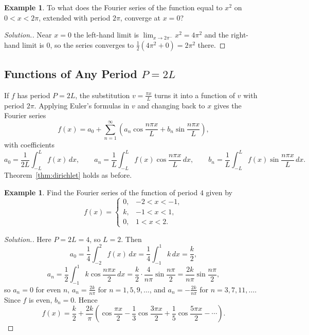 \documentclass[11pt,a4paper]{article}
\theoremstyle{definition}
\newtheorem{exa}[thm]{Example}
\newenvironment{solution}
  {\renewcommand{\qedsymbol}{}\begin{proof}[\textit{Solution}.]}
  {\end{proof}}
\begin{document}
\begin{exa}
\label{ex:convergencesum}
To what does the Fourier series of the function equal to $x^2$ on
$0<x<2\pi$, extended with period $2\pi$, converge at $x = 0$?
\end{exa}

\begin{solution}
Near $x = 0$ the left-hand limit is $\lim_{x\to 2\pi^-}x^2 = 4\pi^2$ and the
right-hand limit is $0$, so the series converges to $\frac12(4\pi^2 + 0) =
2\pi^2$ there.
\end{solution}

{\color[wave]{485}\subsection{Functions of Any Period $P=2L$}}

If $f$ has period $P = 2L$, the substitution $v = \frac{\pi x}{L}$ turns it into
a function of $v$ with period $2\pi$. Applying Euler's formulas in $v$ and
changing back to $x$ gives the Fourier series
\[f(x) = a_0 + \sum^{\infty}_{n=1} \left(a_n \cos \frac{n\pi x}{L} + b_n \sin
\frac{n\pi x}{L}\right),\]
with coefficients
\[a_0 = \frac{1}{2L}\int^{L}_{-L}f(x)\,dx ,\qquad a_n = \frac{1}{L}\int^{L}_{-L}
f(x) \cos \frac{n\pi x}{L}\,dx ,\qquad b_n = \frac{1}{L}\int^{L}_{-L} f(x)\sin
\frac{n\pi x}{L}\,dx .\]
Theorem~\ref{thm:dirichlet} holds as before.

\begin{exa}
\label{ex:period4}
Find the Fourier series of the function of period $4$ given by
\[f(x)=
\begin{cases}
0, & -2 < x <-1,\\
k, & -1 < x < 1,\\
0, & 1 < x < 2 .
\end{cases}\]
\end{exa}

\begin{solution}
Here $P = 2L = 4$, so $L = 2$. Then
\[a_0 = \frac{1}{4}\int^2_{-2}f(x)\,dx = \frac{1}{4}\int^1_{-1} k\, dx =
\frac{k}{2},\]
\[a_n = \frac{1}{2}\int^1_{-1}k\cos \frac{n\pi x}{2}\,dx = \frac{k}{2}\cdot
\frac{4}{n\pi}\sin \frac{n\pi}{2} = \frac{2k}{n\pi}\sin \frac{n\pi}{2} ,\]
so $a_n = 0$ for even $n$, $a_n = \frac{2k}{n\pi}$ for $n = 1, 5, 9, \dots$, and
$a_n = -\frac{2k}{n\pi}$ for $n = 3, 7, 11, \dots$. Since $f$ is even,
$b_n = 0$. Hence
\[f(x) = \frac{k}{2} + \frac{2k}{\pi}\left( \cos \frac{\pi x}{2} - \frac{1}{3}\cos
\frac{3\pi x}{2} + \frac{1}{5}\cos \frac{5\pi x}{2} - \cdots\right) .\]
\end{solution}
\end{document}
